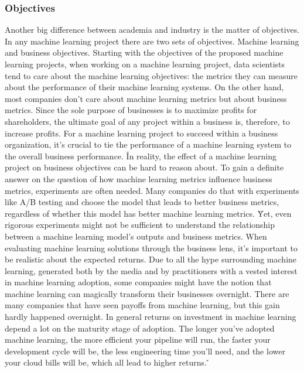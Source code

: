 
\subsubsection{Objectives}

Another big difference between academia and industry is the matter of objectives. In any machine learning project
there are two sets of objectives. Machine learning and business objectives. Starting with the objectives of the
proposed machine learning projects, when working on a machine learning project, data scientists tend to care about
the machine learning objectives: the metrics they can measure about the performance of their machine learning systems.
On the other hand, most companies don't care about machine learning metrics but about business metrics. Since the
sole purpose of businesses is to maximize profits for shareholders, the ultimate goal of any project within a
business is, therefore, to increase profits. For a machine learning project to succeed within a business organization,
it's crucial to tie the performance of a machine learning system to the overall business performance. \v

In reality, the effect of a machine learning project on business objectives can be hard to reason about. To gain a
definite answer on the question of how machine learning metrics influence business metrics, experiments are often needed.
Many companies do that with experiments like A/B testing and choose the model that leads to better business metrics,
regardless of whether this model has better machine learning metrics. \v

Yet, even rigorous experiments might not be sufficient to understand the relationship between a machine learning
model's outputs and business metrics. When evaluating machine learning solutions through the business lens, it's
important to be realistic about the expected returns. Due to all the hype surrounding machine learning, generated
both by the media and by practitioners with a vested interest in machine learning adoption, some companies might have
the notion that machine learning can magically transform their businesses overnight. There are many companies that
have seen payoffs from machine learning, but this gain hardly happened overnight. In general returns on investment in
machine learning depend a lot on the maturity stage of adoption. The longer you've adopted machine learning, the more
efficient your pipeline will run, the faster your development cycle will be, the less engineering time you'll need,
and the lower your cloud bills will be, which all lead to higher returns. \v 


